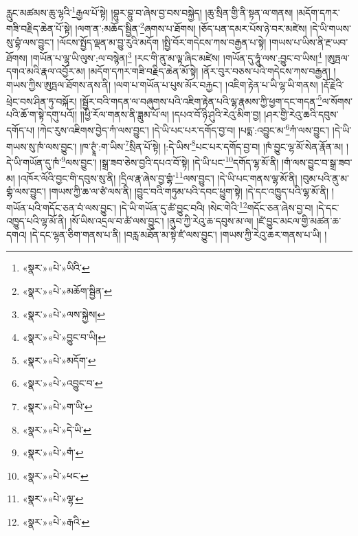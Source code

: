 རླུང་མཚམས་ཆུ་ལྷའི་\footnote{«སྣར་»«པེ་»ཡིའི་}རྒྱལ་པོ་སྟེ། །བྷུར་བྷུ་བ་ཞེས་བྱ་བས་བསྐྱེད། །ཆུ་སྲིན་གྱི་ནི་སྟན་ལ་གནས། །མདོག་དཀར་གཟི་བརྗིད་ཆེན་པོ་སྟེ། །ལག་ན་:མཆོད་སྦྱིན་\footnote{«སྣར་»«པེ་»མཆོག་སྦྱིན་}ཞགས་པ་ཐོགས། །ཅོད་པན་དམར་པོས་ཉེ་བར་མཛེས། །དེ་ཡི་གཡས་སུ་བྷཾ་ལས་བྱུང་། །ལོངས་སྤྱོད་ལྡན་མ་བྱུ་རུའི་མདོག །སྤྱི་བོར་གདེངས་ཀས་བརྒྱན་པ་སྟེ། །གཡས་པ་ཡིས་ནི་རྔ་ཡབ་ཐོགས། །གཡོན་པ་ལྷ་ཡི་ལུས་:ལ་བསྙེན།\footnote{«སྣར་»«པེ་»ལས་སྐྱེས།} །རང་གི་ནུ་མ་ལྟ་ཞིང་མཛེས། །གཡོན་དུ་ཧཱུཾ་ལས་:བྱུང་བ་ཡིས།\footnote{«སྣར་»«པེ་»བྱུང་བ་ཡི།} །ཨུཏྤལ་དགའ་མའི་རྣལ་འབྱོར་མ། །མདོག་དཀར་གཟི་བརྗིད་ཆེན་མོ་སྟེ། །ནོར་བུར་བཅས་པའི་གདེངས་ཀས་བརྒྱན། །གཡས་ཀྱིས་ཨུཏྤལ་ཐོགས་ནས་ནི། །ལག་པ་གཡོན་པ་པུས་མོར་བརྐྱང་། །འཇིག་རྟེན་པ་ཡི་ལྷ་ཡི་གནས། །རྡོ་རྗེའི་ཕྲེང་བས་ཤིན་ཏུ་བསྐོར། །སྦྱོར་བའི་གདན་ལ་བཞུགས་པའི་འཇིག་རྟེན་པའི་ལྷ་རྣམས་ཀྱི་ཕྱག་དང་གདན་\footnote{«སྣར་»«པེ་»མདོག་}ལ་སོགས་པའི་ཆོ་ག་སྟེ་དགུ་པའོ།། །།ཕྱི་རོལ་གནས་ནི་ཟླུམ་པོ་ལ། །དཔའ་བོ་ཉི་ཤུའི་རེའུ་མིག་བྱ། །ཤར་གྱི་རེའུ་ཆའི་དབུས་དགོད་པ། །ཀེང་རུས་འཇིགས་བྱེད་ཀཾ་ལས་བྱུང་། །དེ་ཡི་པང་པར་དགོད་བྱ་བ། །པདྨ་:འབྱུང་མ་\footnote{«སྣར་»«པེ་»འབྱུང་བ་}ཀཾ་ལས་བྱུང་། །དེ་ཡི་གཡས་སུ་ཁཾ་ལས་བྱུང་། །ཁ་ཊྭཱཾ་:ག་ཡིས་\footnote{«སྣར་»«པེ་»ག་ཡི་}སྲིན་པོ་སྟེ། །:དེ་ཡིས་\footnote{«སྣར་»«པེ་»དེ་ཡི་}པང་པར་དགོད་བྱ་བ། །ཁཾ་བྱུང་ལྷ་མོ་སེན་རྣོན་མ། །དེ་ཡི་གཡོན་དུ་ཁཾ་\footnote{«སྣར་»«པེ་»གཾ་}ལས་བྱུང་། །སྒྲ་ཟབ་ཅེས་བྱའི་དཔའ་བོ་སྟེ། །དེ་ཡི་པང་\footnote{«སྣར་»«པེ་»ཕང་}དགོད་ལྷ་མོ་ནི། །གཾ་ལས་བྱུང་བ་སྒྲ་ཟབ་མ། །འཁོར་ལོའི་བྱང་གི་དབུས་སུ་ནི། །དྲིལ་རྣ་ཞེས་བྱ་གྷཾ་\footnote{«སྣར་»«པེ་»ལྷ་}ལས་བྱུང་། །དེ་ཡི་པང་གནས་ལྷ་མོ་ནི། །བུམ་པའི་ནུ་མ་གྷཾ་ལས་བྱུང་། །གཡས་ཀྱི་ཆ་ལ་ཙཾ་ལས་ནི། །བྱུང་བའི་གཏུམ་པའི་དབང་ཕྱུག་སྟེ། །དེ་དང་འཁྱུད་པའི་ལྷ་མོ་ནི། །གཡོན་པའི་གདོང་ཅན་བཾ་ལས་བྱུང་། །དེ་ཡི་གཡོན་དུ་ཚཾ་བྱུང་བའི། །སེང་གེའི་\footnote{«སྣར་»«པེ་»རྒའི་}གདོང་ཅན་ཞེས་བྱ་བ། །དེ་དང་འཁྱུད་པའི་ལྷ་མོ་ནི། །སོ་ཡིས་འདྲལ་བ་ཚཾ་ལས་བྱུང་། །ནུབ་ཀྱི་རེའུ་ཆ་དབུས་མ་ལ། །ཛཾ་བྱུང་མངལ་གྱི་མཚན་ཆ་དགའ། །དེ་དང་ལྷན་ཅིག་གནས་པ་ནི། །བརླ་མཐོན་མ་སྟེ་ཛཾ་ལས་བྱུང་། །གཡས་ཀྱི་རེའུ་ཆར་གནས་པ་ཡི། །
